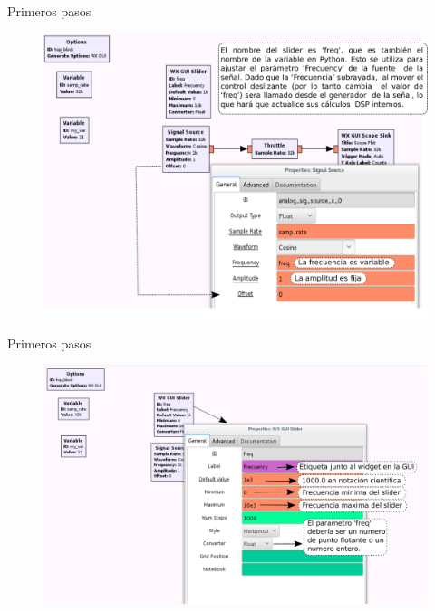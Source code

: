 \begin{frame}{Primeros pasos}
\begin{figure}[H]
\vspace{-3mm}
\centering
\includegraphics[width=.85\textwidth]{lab1/pdf/lab1_12.pdf}
\end{figure}
\end{frame}

\begin{frame}{Primeros pasos}
\begin{figure}[H]
\vspace{-3mm}
\centering
\includegraphics[width=\textwidth]{lab1/pdf/lab1_13.pdf}
\end{figure}
\end{frame}

